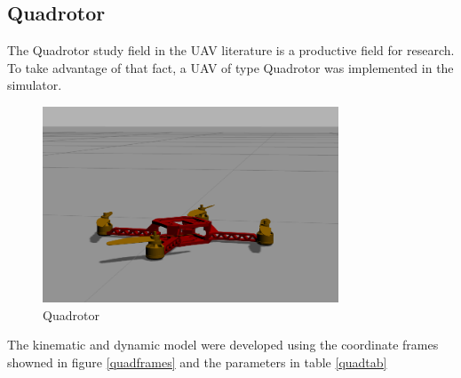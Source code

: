 \subsection{Quadrotor}

The Quadrotor study field in the UAV literature is a productive field for research. To take advantage of that fact, a UAV of type Quadrotor was implemented in the simulator.


\begin{figure}[!ht]
	\centering
	\includegraphics[width=250pt]{figuras/quad.png}
	\caption{Quadrotor}
	\label{quad}
\end{figure}


The kinematic and dynamic model were developed using the coordinate frames showned in figure \ref{quadframes} and the parameters in table \ref{quadtab}

